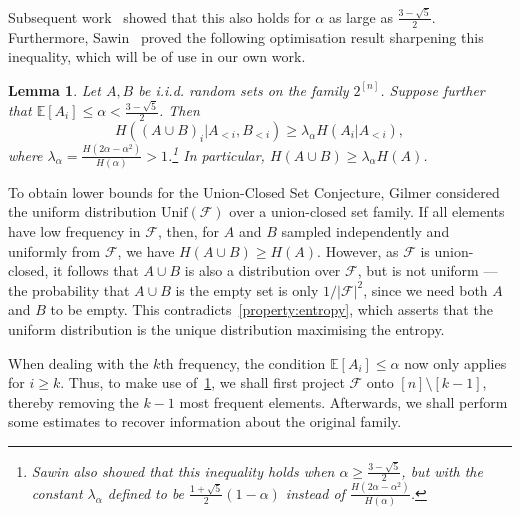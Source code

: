 \documentclass[a4paper,12pt]{article}
\theoremstyle{mystyle}	%
\newtheorem{lemma}[theorem]{Lemma}
\theoremstyle{definition}
\newcommand{\E}{\mathbb{E}}
\newcommand{\F}{\mathcal{F}}
\newcommand{\6}{\partial}
\begin{document}
    Subsequent work~\cite{alweiss2022improved,sawin2023improved} showed that this also holds for $\alpha$ as large as $\frac{3-\sqrt{5}}{2}$. Furthermore, Sawin~\cite{sawin2023improved} proved the following optimisation result sharpening this inequality, which will be of use in our own work.
    \begin{lemma}\label{lemma:afterk}
        Let $A,B$ be i.i.d. random sets on the family $2^{[n]}$. Suppose further that $\E[A_i]\leq \alpha< \frac{3-\sqrt{5}}{2}$. Then 
        \[H((A\cup B)_i|A_{< i},B_{<i}) \geq \lambda_\alpha H(A_i |A_{< i}),\]
        where $\lambda_\alpha =\frac{H(2\alpha-\alpha^2)}{H(\alpha)}>1$.\footnote{Sawin also showed that this inequality holds when $\alpha \ge \frac{3 - \sqrt{5}}{2}$, but with the constant $\lambda_{\alpha}$ defined to be $\frac{1+\sqrt{5}}{2} (1 - \alpha)$ instead of $\frac{H(2\alpha - \alpha^2)}{H(\alpha)}$.} In particular, $H(A\cup B)\geq \lambda_\alpha H(A)$.
    \end{lemma}

To obtain lower bounds for the Union-Closed Set Conjecture, Gilmer considered the uniform distribution $\mathrm{Unif}(\F)$ over a union-closed set family. If all elements have low frequency in $\F$, then, for $A$ and $B$ sampled independently and uniformly from $\F$, we have $H(A \cup B) \ge H(A)$. However, as $\F$ is union-closed, it follows that $A \cup B$ is also a distribution over $\F$, but is not uniform --- the probability that $A \cup B$ is the empty set is only $1/|\F|^2$, since we need both $A$ and $B$ to be empty. This contradicts~\cref{property:entropy}, which asserts that the uniform distribution is the unique distribution maximising the entropy.

When dealing with the $k$th frequency, the condition $\E[A_i] \le \alpha$ now only applies for $i \ge k$. Thus, to make use of~\cref{lemma:afterk}, we shall first project $\F$ onto $[n] \setminus [k-1]$, thereby removing the $k-1$ most frequent elements. Afterwards, we shall perform some estimates to recover information about the original family.
\end{document}
